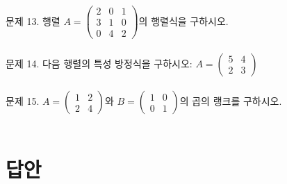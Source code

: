 \documentclass[fleqn]{article}
\begin{document}
\noindent 문제 13. 행렬 \( A = \begin{pmatrix} 2 & 0 & 1 \\ 3 & 1 & 0 \\ 0 & 4 & 2 \end{pmatrix} \)의 행렬식을 구하시오. \\\\

\noindent 문제 14. 다음 행렬의 특성 방정식을 구하시오: \( A = \begin{pmatrix} 5 & 4 \\ 2 & 3 \end{pmatrix} \) \\\\

\noindent 문제 15. \( A = \begin{pmatrix} 1 & 2 \\ 2 & 4 \end{pmatrix} \)와 \( B = \begin{pmatrix} 1 & 0 \\ 0 & 1 \end{pmatrix} \)의 곱의 랭크를 구하시오. \\\\

\section*{답안}
\end{document}
